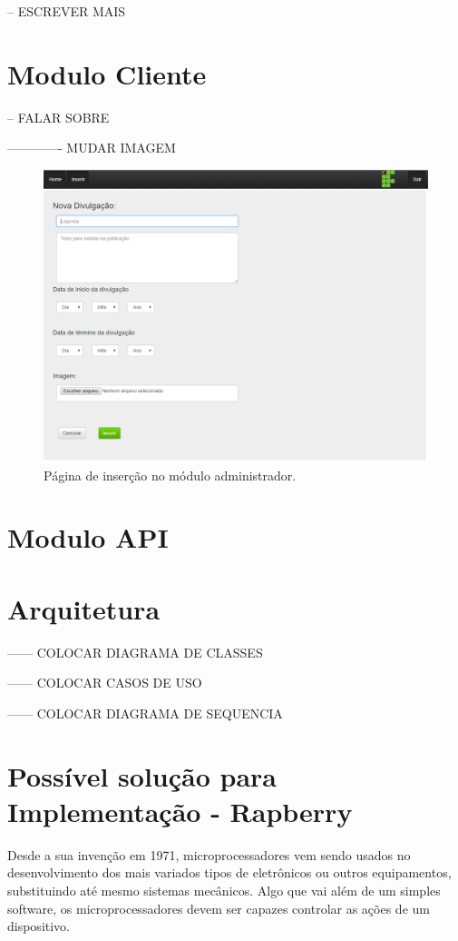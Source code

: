 -- ESCREVER MAIS

\section{Modulo Cliente}
-- FALAR SOBRE

 ------------- MUDAR IMAGEM
\begin{figure}[!htb]
\centering
\includegraphics[scale=0.6]{figuras/administrador1}
\caption{Página de inserção no módulo administrador.}
\label{Rotulo}
\end{figure}

\section{Modulo API}
\section{Arquitetura}
------ COLOCAR DIAGRAMA DE CLASSES

------ COLOCAR CASOS DE USO

------ COLOCAR DIAGRAMA DE SEQUENCIA
 

\section{Possível solução para Implementação - Rapberry}
Desde a sua invenção em 1971, microprocessadores vem sendo usados no desenvolvimento dos mais variados tipos de eletrônicos ou outros equipamentos, substituindo até mesmo sistemas mecânicos. Algo que vai além de um simples software, os microprocessadores devem ser capazes controlar as ações de um dispositivo. \cite{rosenstark2007}

